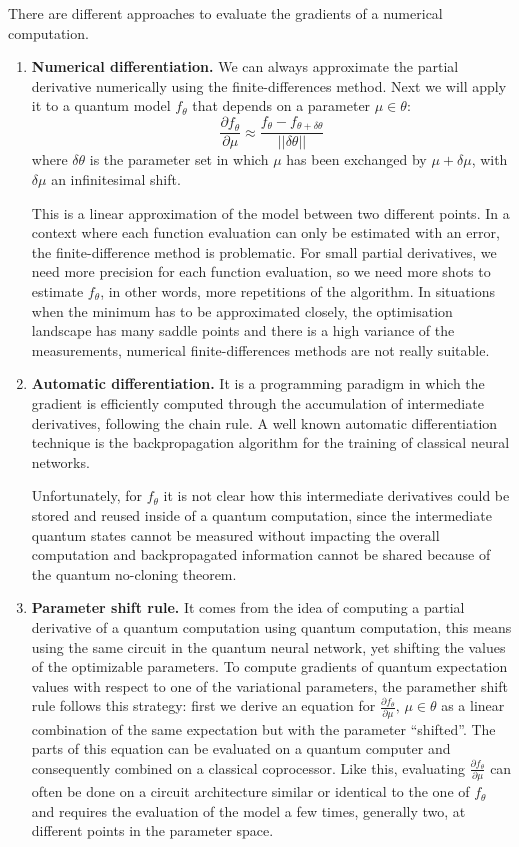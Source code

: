 There are different approaches to evaluate the gradients of a numerical computation.
\begin{enumerate}
    \item \textbf{Numerical differentiation.} We can always approximate the partial derivative numerically using the finite-differences method. Next we will apply it to a quantum model $f_{\theta}$ that depends on a parameter $\mu \in \theta$:
    $$\frac{\partial f_{\theta}}{\partial \mu} \approx \frac{f_{\theta} - f_{\theta + \delta \theta}}{|| \delta \theta ||}$$
    where $\delta \theta$ is the parameter set in which $\mu$ has been exchanged by $\mu + \delta \mu$, with $\delta \mu$ an infinitesimal shift.
    
    This is a linear approximation of the model between two different points. In a context where each function evaluation can only be estimated with an error, the finite-difference method is problematic. For small partial derivatives, we need more precision for each function evaluation, so we need more shots to estimate $f_{\theta}$, in other words, more repetitions of the algorithm. In situations when the minimum has to be approximated closely, the optimisation landscape has many saddle points and there is a high variance of the measurements, numerical finite-differences methods are not really suitable. 

    \item \textbf{Automatic differentiation. } It is a programming paradigm in which the gradient is efficiently computed through the accumulation of intermediate derivatives, following the chain rule. A well known automatic differentiation technique is the backpropagation algorithm for the training of classical neural networks.
    
    Unfortunately, for $f_\theta$ it is not clear how this intermediate derivatives could be stored and reused inside of a quantum computation, since the intermediate quantum states cannot be measured without impacting the overall computation and backpropagated information cannot be shared because of the quantum no-cloning theorem.

    \item \textbf{Parameter shift rule.} It comes from the idea of computing a partial derivative of a quantum computation using quantum computation, this means using the same circuit in the quantum neural network, yet shifting the values of the optimizable parameters. To compute gradients of quantum expectation values with respect to one of the variational parameters, the paramether shift rule follows this strategy: first we derive an equation for $\frac{\partial f_{\theta}}{\partial \mu},\, \mu \in \theta$ as a linear combination of the same expectation but with the parameter ``shifted''. The parts of this equation can be evaluated on a quantum computer and consequently combined on a classical coprocessor. Like this, evaluating $\frac{\partial f_{\theta}}{\partial \mu}$ can often be done on a circuit architecture similar or identical to the one of $f_{\theta}$ and requires the  evaluation of the model a few times, generally two, at different points in the parameter space.


\end{enumerate}
